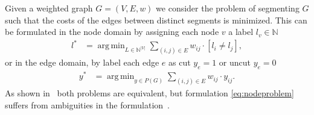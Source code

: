 \documentclass[10pt,twocolumn,letterpaper]{article}
\DeclareMathOperator*{\argmin}{arg\,min}
\begin{document}




Given a weighted graph $G=(V,E,w)$ we consider the problem of segmenting $G$ such that the costs
of the edges between distinct segments is minimized. This can be formulated in the node domain
by assigning each node $v$ a label $l_v \in \mathbb{N}$
\begin{align}
  l^* &= \argmin_{L \in \mathbb{N}^{|V|}} \sum_{ (i,j) \in E } w_{ij} \cdot [l_{i} \neq l_{j}], \label{eq:nodeproblem}
\end{align}  %
or in the edge domain, by label each edge $e$ as cut $y_e=1$ or uncut $y_e=0$ 
\begin{align}
  y^* &= \argmin_{y \in P(G)} \sum_{ (i,j) \in E } w_{ij} \cdot y_{ij} \label{eq:edgeproblem}.%
\end{align}
As shown in~\cite{Kappes-2013-multicut} both problems are equivalent, but formulation \ref{eq:nodeproblem}
suffers from ambiguities in the formulation~\cite{Kappes-2011}.



\end{document}
